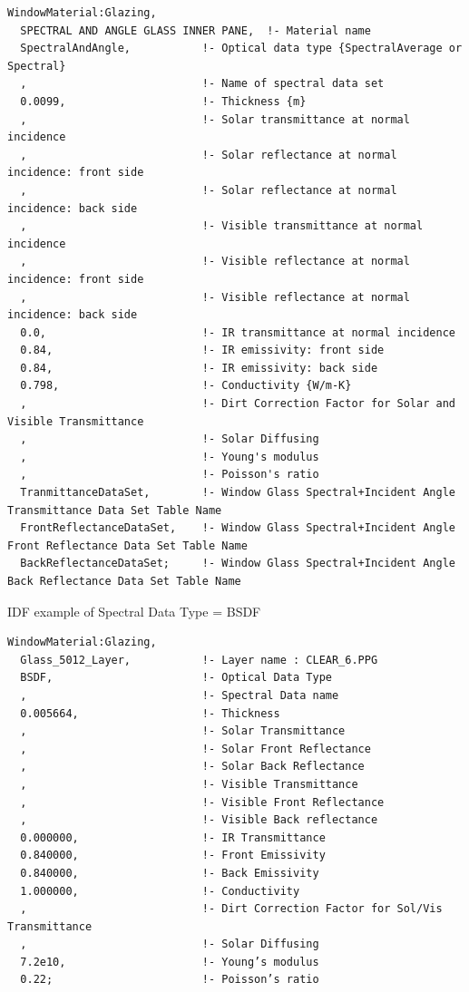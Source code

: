 \begin{lstlisting}
WindowMaterial:Glazing,
  SPECTRAL AND ANGLE GLASS INNER PANE,  !- Material name
  SpectralAndAngle,           !- Optical data type {SpectralAverage or Spectral}
  ,                           !- Name of spectral data set
  0.0099,                     !- Thickness {m}
  ,                           !- Solar transmittance at normal incidence
  ,                           !- Solar reflectance at normal incidence: front side
  ,                           !- Solar reflectance at normal incidence: back side
  ,                           !- Visible transmittance at normal incidence
  ,                           !- Visible reflectance at normal incidence: front side
  ,                           !- Visible reflectance at normal incidence: back side
  0.0,                        !- IR transmittance at normal incidence
  0.84,                       !- IR emissivity: front side
  0.84,                       !- IR emissivity: back side
  0.798,                      !- Conductivity {W/m-K}
  ,                           !- Dirt Correction Factor for Solar and Visible Transmittance
  ,                           !- Solar Diffusing
  ,                           !- Young's modulus
  ,                           !- Poisson's ratio
  TranmittanceDataSet,        !- Window Glass Spectral+Incident Angle Transmittance Data Set Table Name
  FrontReflectanceDataSet,    !- Window Glass Spectral+Incident Angle Front Reflectance Data Set Table Name
  BackReflectanceDataSet;     !- Window Glass Spectral+Incident Angle Back Reflectance Data Set Table Name
\end{lstlisting}

IDF example of Spectral Data Type = BSDF

\begin{lstlisting}
WindowMaterial:Glazing,
  Glass_5012_Layer,           !- Layer name : CLEAR_6.PPG
  BSDF,                       !- Optical Data Type
  ,                           !- Spectral Data name
  0.005664,                   !- Thickness
  ,                           !- Solar Transmittance
  ,                           !- Solar Front Reflectance
  ,                           !- Solar Back Reflectance
  ,                           !- Visible Transmittance
  ,                           !- Visible Front Reflectance
  ,                           !- Visible Back reflectance
  0.000000,                   !- IR Transmittance
  0.840000,                   !- Front Emissivity
  0.840000,                   !- Back Emissivity
  1.000000,                   !- Conductivity
  ,                           !- Dirt Correction Factor for Sol/Vis Transmittance
  ,                           !- Solar Diffusing
  7.2e10,                     !- Young’s modulus
  0.22;                       !- Poisson’s ratio
\end{lstlisting}

